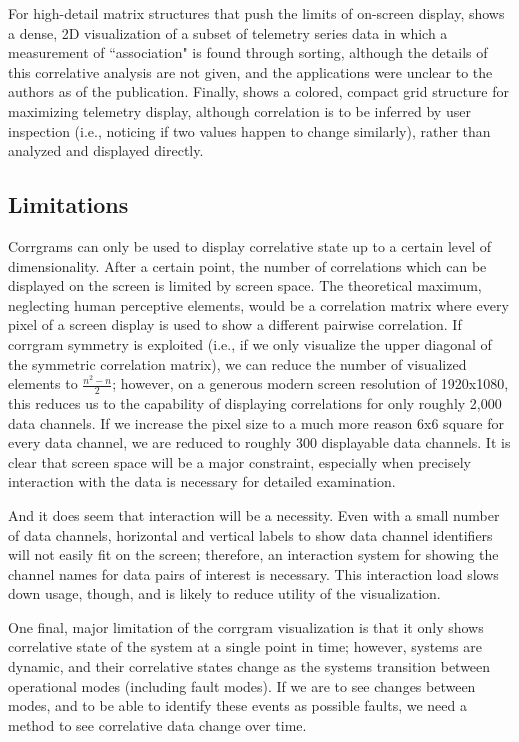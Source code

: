 For high-detail matrix structures that push the limits of on-screen display, \cite{yairi1992telemetry} shows a dense, 2D visualization of a subset of telemetry series data in which a measurement of ``association" is found through sorting, although the details of this correlative analysis are not given, and the applications were unclear to the authors as of the publication. Finally, \cite{cancro2007interactive} shows a colored, compact grid structure for maximizing telemetry display, although correlation is to be inferred by user inspection (i.e., noticing if two values happen to change similarly), rather than analyzed and displayed directly.

\subsection{Limitations}

Corrgrams can only be used to display correlative state up to a certain level of dimensionality. After a certain point, the number of correlations which can be displayed on the screen is limited by screen space. The theoretical maximum, neglecting human perceptive elements, would be a correlation matrix where every pixel of a screen display is used to show a different pairwise correlation. If corrgram symmetry is exploited (i.e., if we only visualize the upper diagonal of the symmetric correlation matrix), we can reduce the number of visualized elements to $\frac{n^{2} - n}{2}$; however, on a generous modern screen resolution of 1920x1080, this reduces us to the capability of displaying correlations for only roughly 2,000 data channels. If we increase the pixel size to a much more reason 6x6 square for every data channel, we are reduced to roughly 300 displayable data channels. It is clear that screen space will be a major constraint, especially when precisely interaction with the data is necessary for detailed examination.

And it does seem that interaction will be a necessity. Even with a small number of data channels, horizontal and vertical labels to show data channel identifiers will not easily fit on the screen; therefore, an interaction system for showing the channel names for data pairs of interest is necessary. This interaction load slows down usage, though, and is likely to reduce utility of the visualization.

One final, major limitation of the corrgram visualization is that it only shows correlative state of the system at a single point in time; however, systems are dynamic, and their correlative states change as the systems transition between operational modes (including fault modes). If we are to see changes between modes, and to be able to identify these events as possible faults, we need a method to see correlative data change over time.

